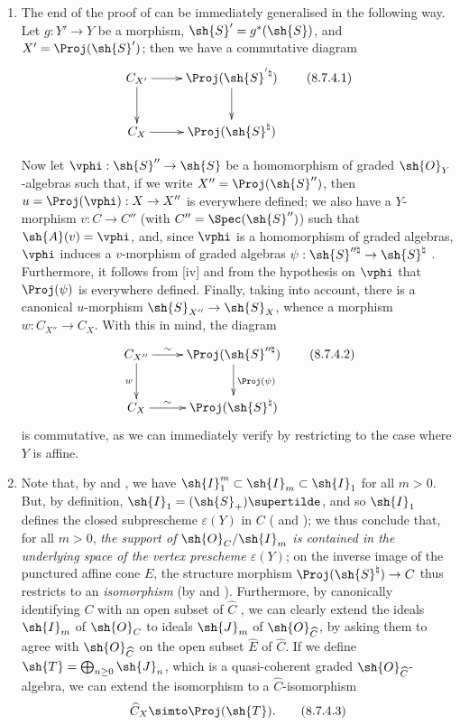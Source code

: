 \begin{remark}[8.7.4]
\label{II.8.7.4}
\begin{enumerate}
  \item[\rm{(i)}] The end of the proof of  can be immediately generalised in the following way.
    Let $g:Y'\to Y$ be a morphism, $\sh{S}'=g^*(\sh{S})$, and $X'=\Proj(\sh{S}')$;
    then we have a commutative diagram
    \[
    \label{II.8.7.4.1}
      \xymatrix{
        C_{X'}
          \ar[r]
          \ar[d]
      & \Proj(\sh{S}^{'\natural})
          \ar[d]
      \\C_X
          \ar[r]
      & \Proj(\sh{S}^\natural)
      }
    \tag{8.7.4.1}
    \]

    Now let $\vphi:\sh{S}''\to\sh{S}$ be a homomorphism of graded $\sh{O}_Y$-algebras such that, if we write $X''=\Proj(\sh{S}'')$, then $u=\Proj(\vphi):X\to X''$ is everywhere defined;
    we also have
    a $Y$-morphism $v:C\to C''$ (with $C''=\Spec(\sh{S}'')$) such that $\sh{A}(v)=\vphi$, and, since $\vphi$ is a homomorphism of graded algebras, $\vphi$ induces a $v$-morphism of graded algebras $\psi:\sh{S}^{\prime\prime\natural}\to\sh{S}^\natural$ .
    Furthermore, it follows from [iv] and from the hypothesis on $\vphi$ that $\Proj(\psi)$ is everywhere defined.
    Finally, taking  into account, there is a canonical $u$-morphism $\sh{S}_{X''}\to\sh{S}_X$, whence  a morphism $w:C_{X''}\to C_X$.
    With this in mind, the diagram
    \[
    \label{II.8.7.4.2}
      \xymatrix{
        C_{X''}
          \ar[r]^-{\sim}
          \ar[d]_{w}
      & \Proj(\sh{S}^{\prime\prime\natural})
          \ar[d]^{\Proj(\psi)}
      \\C_X
          \ar[r]^-{\sim}
      & \Proj(\sh{S}^\natural)
      }
    \tag{8.7.4.2}
    \]
    is commutative, as we can immediately verify by restricting to the case where $Y$ is affine.
  \item[\rm{(ii)}] Note that, by  and , we have $\sh{I}_1^m\subset\sh{I}_m\subset\sh{I}_1$ for all $m>0$.
    But, by definition, $\sh{I}_1=(\sh{S}_+)\supertilde$, and so $\sh{I}_1$ defines the closed subprescheme $\varepsilon(Y)$ in $C$ ( and );
    we thus conclude that, for all $m>0$, \emph{the support of $\sh{O}_C/\sh{I}_m$ is contained in the underlying space of the vertex prescheme $\varepsilon(Y)$};
    on the inverse image of the punctured affine cone $E$, the structure morphism $\Proj(\sh{S}^\natural)\to C$ thus restricts to an \emph{isomorphism} (by  and ).
    Furthermore, by canonically identifying $C$ with an open subset of $\widehat{C}$ , we can clearly extend the ideals $\sh{I}_m$ of $\sh{O}_C$ to ideals $\sh{J}_m$ of $\sh{O}_{\widehat{C}}$, by asking them to agree with $\sh{O}_{\widehat{C}}$ on the open subset $\widehat{E}$ of $\widehat{C}$.
    If we define $\sh{T}=\bigoplus_{n\geq 0}\sh{J}_n$, which is a quasi-coherent graded $\sh{O}_{\widehat{C}}$-algebra, we can extend the isomorphism  to a $\widehat{C}$-isomorphism
    \[
    \label{II.8.7.4.3}
      \widehat{C}_X \simto \Proj(\sh{T}).
    \tag{8.7.4.3}
    \]


\end{enumerate}
\end{remark}
